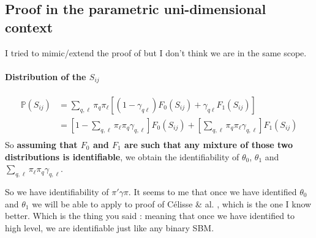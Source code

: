 \subsection{Proof in the parametric uni-dimensional context}

I tried to mimic/extend the proof of \cite{AMR10}  but I don't think we are in the same scope.  

\paragraph{Distribution of the $S_{ij}$}

 \begin{align*}
 \mathbb{P}(S_{ij}) &= \sum_{q,\ell} \pi_{q} \pi_{\ell} [ (1-\gamma_{q\ell})F_0(S_{ij}) + \gamma_{q\ell} F_1(S_{ij} )]\\
&= \left[1-  \sum_{q, \ell}  \pi_\ell \pi_q  \gamma_{q,\ell} \right] F_{0}(S_{ij}) +   \left[ \sum_{q, \ell}  \pi_q \pi_\ell    \gamma_{q,\ell} \right] F_{1}(S_{ij})\\
 \end{align*}
So \textbf{assuming that $F_0$ and $F_1$ are such that any mixture of those two distributions is identifiable}, we obtain the identifiability of $\theta_0$, $\theta_1$ and $ \sum_{q, \ell}  \pi_{\ell} \pi_q   \gamma_{q,\ell}$. 


So we have identifiability of $\pi'  \gamma  \pi$. 
It seems to me that once we have identified $\theta_0$ and $\theta_1$ we will be able to apply to proof of Célisse \& al. \cite{CDP12}, which is the one I know better. Which is the thing you said : meaning that once we have identified to high level, we are identifiable just like any binary SBM. 







